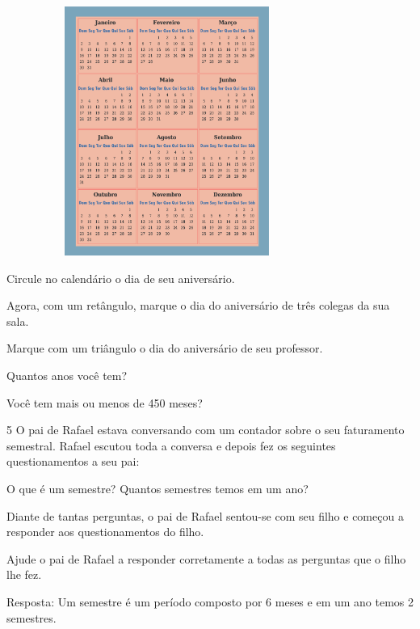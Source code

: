 \begin{escolha}
\includegraphics[width=4.13369in,height=3.20861in]{media/image54.png}

\begin{escolha}
\item
  Circule no calendário o dia de seu aniversário.

\item
  Agora, com um retângulo, marque o dia do aniversário de três colegas da sua sala.

\item
  Marque com um triângulo o dia do aniversário de seu professor.

\item
  Quantos anos você tem?

\item
  Você tem mais ou menos de 450 meses?
\end{escolha}

\num{5} O pai de Rafael estava conversando com um contador sobre o seu
faturamento semestral. Rafael escutou toda a conversa e depois fez os
seguintes questionamentos a seu pai:

O que é um semestre? 
Quantos semestres temos em um ano?

Diante de tantas perguntas, o pai de Rafael sentou-se com seu filho e
começou a responder aos questionamentos do filho.

Ajude o pai de Rafael a responder corretamente a todas as perguntas que o filho lhe fez.


Resposta:
Um semestre é um período composto por 6 meses e em um ano temos 2 semestres.


\end{escolha}
